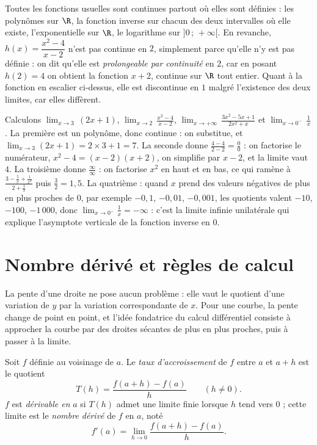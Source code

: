 Toutes les fonctions usuelles sont continues partout où elles sont définies : les polynômes sur $\R$, la fonction inverse sur chacun des deux intervalles où elle existe, l'exponentielle sur $\R$, le logarithme sur $]0\,;\,+\infty[$. En revanche, $h(x) = \dfrac{x^{2}-4}{x-2}$ n'est pas continue en $2$, simplement parce qu'elle n'y est pas définie : on dit qu'elle est \emph{prolongeable par continuité} en $2$, car en posant $h(2) = 4$ on obtient la fonction $x + 2$, continue sur $\R$ tout entier. Quant à la fonction en escalier ci-dessus, elle est discontinue en $1$ malgré l'existence des deux limites, car elles diffèrent.

\begin{exemple}
Calculons $\displaystyle\lim_{x \to 3}\,(2x + 1)$, $\displaystyle\lim_{x \to 2}\,\frac{x^{2} - 4}{x - 2}$, $\displaystyle\lim_{x \to +\infty}\,\frac{3x^{2} - 5x + 1}{2x^{2} + x}$ et $\displaystyle\lim_{x \to 0^{-}}\,\frac{1}{x}$. La première est un polynôme, donc continue : on substitue, et $\lim_{x \to 3}(2x+1) = 2 \times 3 + 1 = 7$. La seconde donne $\frac{4-4}{2-2} = \frac{0}{0}$ : on factorise le numérateur, $x^{2} - 4 = (x-2)(x+2)$, on simplifie par $x - 2$, et la limite vaut $4$. La troisième donne $\frac{\infty}{\infty}$ : on factorise $x^{2}$ en haut et en bas, ce qui ramène à $\frac{3 - \frac{5}{x} + \frac{1}{x^{2}}}{2 + \frac{1}{x}}$ puis $\frac{3}{2} = 1{,}5$. La quatrième : quand $x$ prend des valeurs négatives de plus en plus proches de $0$, par exemple $-0{,}1$, $-0{,}01$, $-0{,}001$, les quotients valent $-10$, $-100$, $-1\,000$, donc $\lim_{x \to 0^{-}} \frac{1}{x} = -\infty$ : c'est la limite infinie unilatérale qui explique l'asymptote verticale de la fonction inverse en $0$.
\end{exemple}

\section{Nombre dérivé et règles de calcul}

La pente d'une droite ne pose aucun problème : elle vaut le quotient d'une variation de $y$ par la variation correspondante de $x$. Pour une courbe, la pente change de point en point, et l'idée fondatrice du calcul différentiel consiste à approcher la courbe par des droites sécantes de plus en plus proches, puis à passer à la limite.

\begin{definition}
Soit $f$ définie au voisinage de $a$. Le \emph{taux d'accroissement} de $f$ entre $a$ et $a+h$ est le quotient
\[
T(h) = \frac{f(a+h) - f(a)}{h} \qquad (h \neq 0).
\]
$f$ est \emph{dérivable en} $a$ si $T(h)$ admet une limite finie lorsque $h$ tend vers $0$ ; cette limite est le \emph{nombre dérivé} de $f$ en $a$, noté
\[
f'(a) = \lim_{h \to 0} \frac{f(a+h) - f(a)}{h}.
\]
\end{definition}

